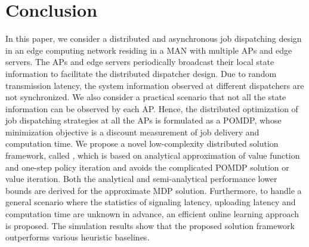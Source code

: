 \section{Conclusion}
\label{sec:conclusion}
In this paper, we consider a distributed and asynchronous job dispatching design in an edge computing network residing in a MAN with multiple APs and edge servers.
The APs and edge servers periodically broadcast their local state information to facilitate the distributed dispatcher design.
Due to random transmission latency, the system information observed at different dispatchers are not synchronized.
We also consider a practical scenario that not all the state information can be observed by each AP.
Hence, the distributed optimization of job dispatching strategies at all the APs is formulated as a POMDP, whose minimization objective is a discount measurement of job delivery and computation time.
We propose a novel low-complexity distributed solution framework, called \algname, which is based on analytical approximation of value function and one-step policy iteration and avoids the complicated POMDP solution or value iteration. Both the analytical and semi-analytical performance lower bounds are derived for the approximate MDP solution.
{Furthermore}, to handle a general scenario where the statistics of signaling latency, uploading latency and computation time are unknown in advance, an efficient online learning approach is proposed.
The simulation results show that the proposed solution framework outperforms various heuristic baselines.
